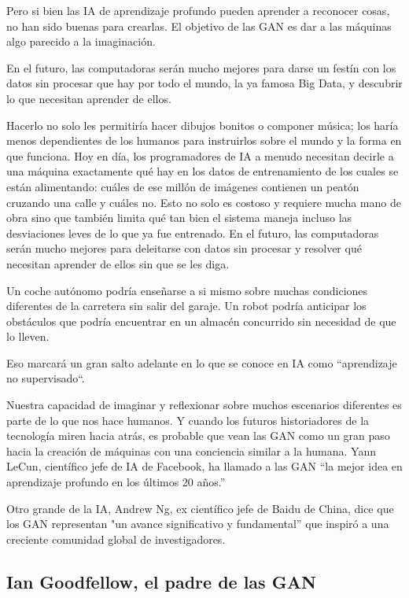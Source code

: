 \documentclass[a4paper]{article}
\begin{document}
Pero si bien las IA de aprendizaje profundo pueden aprender a reconocer cosas, no han sido buenas para crearlas. El objetivo de las GAN es dar a las máquinas algo parecido a la imaginación.

En el futuro, las computadoras serán mucho mejores para darse un festín con los datos sin procesar que hay por todo el mundo, la ya famosa Big Data, y descubrir lo que necesitan aprender de ellos.

Hacerlo no solo les permitiría hacer dibujos bonitos o componer música; los haría menos dependientes de los humanos
para instruirlos sobre el mundo y la forma en que funciona. Hoy en día, los programadores de IA a menudo necesitan decirle a una máquina exactamente qué hay en los datos de entrenamiento de los cuales se están alimentando: cuáles de ese millón de imágenes contienen un peatón cruzando una calle y cuáles
no. Esto no solo es costoso y requiere mucha mano de obra sino que también limita qué tan bien el sistema maneja incluso las desviaciones leves de lo que ya fue entrenado. En el futuro, las computadoras serán mucho mejores para deleitarse con datos sin procesar y resolver qué necesitan aprender de ellos sin que se les diga.

 Un coche autónomo podría enseñarse a si mismo sobre muchas condiciones diferentes de la carretera sin salir del garaje. Un robot podría anticipar los obstáculos que podría encuentrar en un almacén concurrido sin necesidad de que lo lleven.

Eso marcará un gran salto adelante en lo que se conoce en IA como ``aprendizaje no supervisado``.

Nuestra capacidad de imaginar y reflexionar sobre muchos escenarios diferentes es parte de lo que nos hace humanos. Y cuando los futuros historiadores de la tecnología miren hacia atrás, es probable que vean las GAN como un gran paso hacia la creación de máquinas con una conciencia similar a la humana. Yann LeCun, científico jefe de IA de Facebook, ha llamado a las GAN “la mejor idea en aprendizaje profundo en los últimos 20 años.” 

Otro grande de la IA, Andrew Ng, ex científico jefe de Baidu de China, dice que los GAN representan "un
avance significativo y fundamental” que inspiró a una creciente comunidad global de investigadores.

\subsection{Ian Goodfellow, el padre de las GAN}
\end{document}
